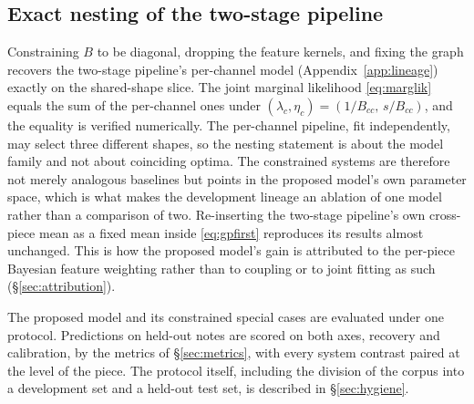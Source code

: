 \subsection{Exact nesting of the two-stage pipeline}
Constraining $B$ to be diagonal, dropping the feature kernels, and fixing
the graph recovers the two-stage pipeline's per-channel model
(Appendix~\ref{app:lineage}) exactly on the shared-shape slice. The joint
marginal likelihood \eqref{eq:marglik} equals the sum of the per-channel
ones under $(\lambda_c, \eta_c) = (1/B_{cc},\, s/B_{cc})$, and the equality
is verified numerically. The per-channel pipeline, fit independently, may
select three different shapes, so the nesting statement is about the model
family and not about coinciding optima. The constrained systems are
therefore not merely analogous baselines but points in the proposed model's
own parameter space, which is what makes the development lineage an
ablation of one model rather than a comparison of two. Re-inserting the
two-stage pipeline's own cross-piece mean as a fixed mean inside
\eqref{eq:gpfirst} reproduces its results almost unchanged. This is how the
proposed model's gain is attributed to the per-piece Bayesian feature
weighting rather than to coupling or to joint fitting as such
(\S\ref{sec:attribution}).

The proposed model and its constrained special cases are evaluated under
one protocol. Predictions on held-out notes are scored on both axes,
recovery and calibration, by the metrics of \S\ref{sec:metrics}, with every
system contrast paired at the level of the piece. The protocol itself,
including the division of the corpus into a development set and a held-out
test set, is described in \S\ref{sec:hygiene}.


